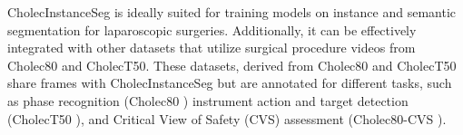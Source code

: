 CholecInstanceSeg is ideally suited for training models on instance and semantic segmentation for laparoscopic surgeries. Additionally, it can be effectively integrated with other datasets that utilize surgical procedure videos from Cholec80 and CholecT50. These datasets, derived from Cholec80 and CholecT50 share frames with CholecInstanceSeg but are annotated for different tasks, such as phase recognition (Cholec80 \cite{EndoNet}) instrument action and target detection (CholecT50 \cite{NWOYE2022102433_rendevous}), and Critical View of Safety (CVS) assessment (Cholec80-CVS \cite{rios2023cholec80}).





